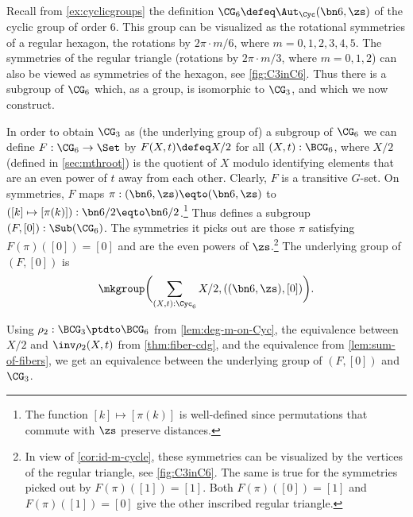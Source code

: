 \begin{example}
  \label{exa:C3subC6}%
Recall from \cref{ex:cyclicgroups} the definition 
$\CG_6\defeq\Aut_\Cyc(\bn6,\zs)$ of the cyclic group of order $6$.
This group can be visualized as the rotational symmetries of a regular
hexagon,  \ie the rotations by $2\pi\cdot m /6$, where $m=0,1,2,3,4,5$.
The symmetries of the regular triangle (rotations by $2\pi\cdot m/3$, 
where $m=0,1,2$) can also be viewed as symmetries of the hexagon,
see \cref{fig:C3inC6}.
Thus there is a subgroup of $\CG_6$ which, as a group, is isomorphic to 
$\CG_3$, and which we now construct.

\begin{marginfigure}
\caption{\label{fig:C3inC6}Geometrical shapes illustrating 
$\protect\CG_3$ as subgroup of $\protect\CG_6$.}
\end{marginfigure}

In order to obtain $\CG_3$ as (the underlying group of) a subgroup of $\CG_6$ we
can define $F : \CG_6 \to \Set$ by $F(X,t) \defeq X/2$ for all $(X,t):\BCG_6$,
where $X/2$ (defined in \cref{sec:mthroot}) is the quotient of $X$ modulo
identifying elements that are an even power of $t$ away from each other.
Clearly, $F$ is a transitive $G$-set.  On symmetries, $F$ maps
$\pi : (\bn6,\zs) \eqto (\bn6,\zs)$ to
$([k] \mapsto [\pi(k)]) : \bn6 /2 \eqto \bn6 /2$.\footnote{%
  The function $[k] \mapsto [\pi(k)]$ is well-defined since permutations that
  commute with $\zs$ preserve distances.}  Thus defines a subgroup
$(F,[0]) : \Sub(\CG_6)$. The symmetries it picks out are those $\pi$ satisfying
$F(\pi)([0])=[0]$ and are the even powers of $\zs$.\footnote{%
  In view of \cref{cor:id-m-cycle}, these symmetries can be visualized by the
  vertices of the regular triangle, see \cref{fig:C3inC6}.  The same is true for
  the symmetries picked out by $F(\pi)([1])=[1]$.  Both $F(\pi)([0])=[1]$ and
  $F(\pi)([1])=[0]$ give the other inscribed regular triangle.} The underlying
group of $(F,[0])$ is
\begin{displaymath}
  \mkgroup\biggl(\sum_{(X,t):\Cyc_6} X/2, ((\bn6,\zs),[0])\biggr).
\end{displaymath}

Using $\rho_2: \BCG_3 \ptdto \BCG_6$ from \cref{lem:deg-m-on-Cyc}, the
equivalence between $X/2$ and $\inv\rho_2 (X,t)$ from \cref{thm:fiber-cdg}, and
the equivalence from \cref{lem:sum-of-fibers}, we get an equivalence between the
underlying group of $(F,[0])$ and $\CG_3$.
\end{example}

